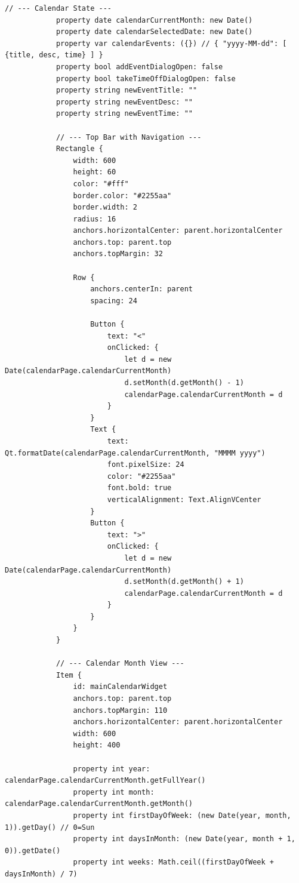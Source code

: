 \documentclass{report}
\begin{document}
\begin{lstlisting}[style=qmlstyle]
            // --- Calendar State ---
            property date calendarCurrentMonth: new Date()
            property date calendarSelectedDate: new Date()
            property var calendarEvents: ({}) // { "yyyy-MM-dd": [ {title, desc, time} ] }
            property bool addEventDialogOpen: false
            property bool takeTimeOffDialogOpen: false
            property string newEventTitle: ""
            property string newEventDesc: ""
            property string newEventTime: ""

            // --- Top Bar with Navigation ---
            Rectangle {
                width: 600
                height: 60
                color: "#fff"
                border.color: "#2255aa"
                border.width: 2
                radius: 16
                anchors.horizontalCenter: parent.horizontalCenter
                anchors.top: parent.top
                anchors.topMargin: 32

                Row {
                    anchors.centerIn: parent
                    spacing: 24

                    Button {
                        text: "<"
                        onClicked: {
                            let d = new Date(calendarPage.calendarCurrentMonth)
                            d.setMonth(d.getMonth() - 1)
                            calendarPage.calendarCurrentMonth = d
                        }
                    }
                    Text {
                        text: Qt.formatDate(calendarPage.calendarCurrentMonth, "MMMM yyyy")
                        font.pixelSize: 24
                        color: "#2255aa"
                        font.bold: true
                        verticalAlignment: Text.AlignVCenter
                    }
                    Button {
                        text: ">"
                        onClicked: {
                            let d = new Date(calendarPage.calendarCurrentMonth)
                            d.setMonth(d.getMonth() + 1)
                            calendarPage.calendarCurrentMonth = d
                        }
                    }
                }
            }

            // --- Calendar Month View ---
            Item {
                id: mainCalendarWidget
                anchors.top: parent.top
                anchors.topMargin: 110
                anchors.horizontalCenter: parent.horizontalCenter
                width: 600
                height: 400
            
                property int year: calendarPage.calendarCurrentMonth.getFullYear()
                property int month: calendarPage.calendarCurrentMonth.getMonth()
                property int firstDayOfWeek: (new Date(year, month, 1)).getDay() // 0=Sun
                property int daysInMonth: (new Date(year, month + 1, 0)).getDate()
                property int weeks: Math.ceil((firstDayOfWeek + daysInMonth) / 7)
            

\end{lstlisting}
\end{document}
